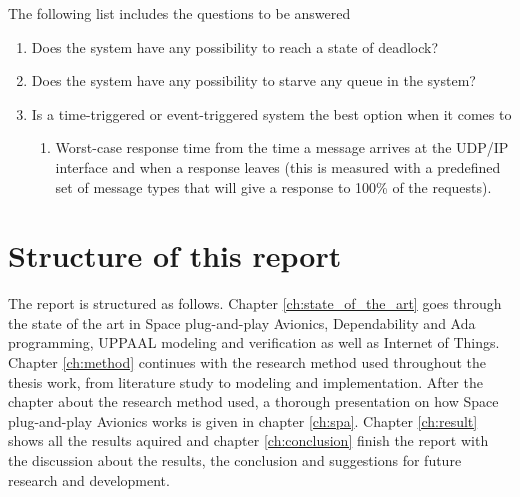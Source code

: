 The following list includes the questions to be answered
\begin{enumerate}
    \item Does the system have any possibility to reach a state of deadlock?
    \item Does the system have any possibility to starve any queue in the
        system?
    \item Is a time-triggered or event-triggered system the best option when it comes to
        \begin{enumerate}
            \item Worst-case response time from the time a message arrives at
                the UDP/IP interface and when a response leaves (this is
                measured with a predefined set of message types that will give
                a response to 100\% of the requests).
        \end{enumerate}
\end{enumerate}

\section{Structure of this report}
The report is structured as follows. Chapter \ref{ch:state_of_the_art} goes
through the state of the art in Space plug-and-play Avionics, Dependability and
Ada programming, UPPAAL modeling and verification as well as Internet of
Things.  Chapter \ref{ch:method} continues with the research method used
throughout the thesis work, from literature study to modeling and
implementation. After the chapter about the research method used, a thorough
presentation on how Space plug-and-play Avionics works is given in chapter
\ref{ch:spa}. Chapter \ref{ch:result} shows all the results aquired and chapter
\ref{ch:conclusion} finish the report with the discussion about the results,
the conclusion and suggestions for future research and development.

